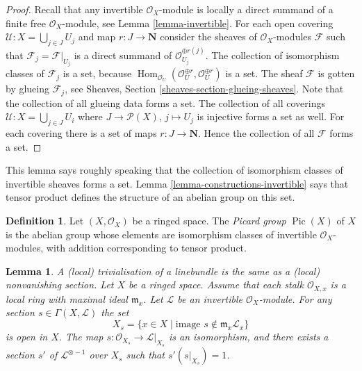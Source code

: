 \documentclass{stacks-project}
\newenvironment{slogan}{\comment}{\endcomment}
\theoremstyle{plain}
\newtheorem{lemma}[subsection]{Lemma}
\theoremstyle{definition}
\newtheorem{definition}[subsection]{Definition}
\theoremstyle{remark}
\numberwithin{equation}{subsection}
\def\Hom{\mathop{\mathrm{Hom}}\nolimits}
\def\Pic{\mathop{\mathrm{Pic}}\nolimits}
\begin{document}
\begin{proof}
Recall that any invertible $\mathcal{O}_X$-module is locally
a direct summand of a finite free $\mathcal{O}_X$-module, see
Lemma \ref{lemma-invertible}.
For each open covering $\mathcal{U} : X = \bigcup_{j \in J} U_j$
and map $r : J \to \mathbf{N}$ consider the sheaves of
$\mathcal{O}_X$-modules $\mathcal{F}$ such that
$\mathcal{F}_j = \mathcal{F}|_{U_j}$ is a direct summand of
$\mathcal{O}_{U_j}^{\oplus r(j)}$.
The collection of isomorphism classes of $\mathcal{F}_j$ is a set, because
$\Hom_{\mathcal{O}_U}(\mathcal{O}_U^{\oplus r}, \mathcal{O}_U^{\oplus r})$
is a set. The sheaf $\mathcal{F}$ is gotten by glueing $\mathcal{F}_j$,
see Sheaves, Section
\ref{sheaves-section-glueing-sheaves}. Note that the collection of
all glueing data forms a set. The collection of all coverings
$\mathcal{U} : X = \bigcup_{j \in J} U_i$ where $J \to \mathcal{P}(X)$,
$j \mapsto U_j$ is injective forms a set as well. For each covering
there is a set of maps $r : J \to \mathbf{N}$. Hence the collection
of all $\mathcal{F}$ forms a set.
\end{proof}

\noindent
This lemma says roughly speaking that the collection of
isomorphism classes of invertible sheaves forms a set.
Lemma \ref{lemma-constructions-invertible} says that
tensor product defines the structure of an abelian group
on this set.

\begin{definition}
\label{definition-pic}
Let $(X, \mathcal{O}_X)$ be a ringed space.
The {\it Picard group} $\Pic(X)$ of $X$ is the
abelian group whose elements are isomorphism classes of
invertible $\mathcal{O}_X$-modules, with addition
corresponding to tensor product.
\end{definition}

\begin{lemma}
\label{lemma-s-open}
\begin{slogan}
A (local) trivialisation of a linebundle
is the same as a (local) nonvanishing section.
\end{slogan}
Let $X$ be a ringed space. Assume that each stalk $\mathcal{O}_{X, x}$
is a local ring with maximal ideal $\mathfrak m_x$.
Let $\mathcal{L}$ be an invertible $\mathcal{O}_X$-module.
For any section $s \in \Gamma(X, \mathcal{L})$ the set
$$
X_s = \{x \in X \mid \text{image }s \not\in \mathfrak m_x\mathcal{L}_x\}
$$
is open in $X$. The map $s : \mathcal{O}_{X_s} \to \mathcal{L}|_{X_s}$
is an isomorphism, and there exists a section $s'$
of $\mathcal{L}^{\otimes -1}$ over $X_s$ such that $s' (s|_{X_s}) = 1$.
\end{lemma}
\end{document}
